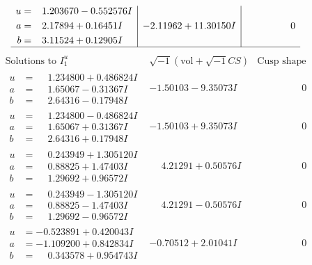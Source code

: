 \documentclass[1p]{elsarticle_modified}
\theoremstyle{definition}
\newcommand{\I}{\sqrt{-1}}
\begin{document}
$$\begin{array}{c|c|c}
\begin{aligned}
u &= \phantom{-}1.203670 - 0.552576 I \\
a &= \phantom{-}2.17894 + 0.16451 I \\
b &= \phantom{-}3.11524 + 0.12905 I\end{aligned}
 & -2.11962 + 11.30150 I & \phantom{-0.000000 } 0\\
 \hline 
 \end{array}$$\newpage$$\begin{array}{c|c|c}  
\text{Solutions to }I^u_{1}& \I (\text{vol} + \sqrt{-1}CS) & \text{Cusp shape}\\
 \hline 
\begin{aligned}
u &= \phantom{-}1.234800 + 0.486824 I \\
a &= \phantom{-}1.65067 - 0.31367 I \\
b &= \phantom{-}2.64316 - 0.17948 I\end{aligned}
 & -1.50103 - 9.35073 I & \phantom{-0.000000 } 0 \\ \hline\begin{aligned}
u &= \phantom{-}1.234800 - 0.486824 I \\
a &= \phantom{-}1.65067 + 0.31367 I \\
b &= \phantom{-}2.64316 + 0.17948 I\end{aligned}
 & -1.50103 + 9.35073 I & \phantom{-0.000000 } 0 \\ \hline\begin{aligned}
u &= \phantom{-}0.243949 + 1.305120 I \\
a &= \phantom{-}0.88825 + 1.47403 I \\
b &= \phantom{-}1.29692 + 0.96572 I\end{aligned}
 & \phantom{-}4.21291 + 0.50576 I & \phantom{-0.000000 } 0 \\ \hline\begin{aligned}
u &= \phantom{-}0.243949 - 1.305120 I \\
a &= \phantom{-}0.88825 - 1.47403 I \\
b &= \phantom{-}1.29692 - 0.96572 I\end{aligned}
 & \phantom{-}4.21291 - 0.50576 I & \phantom{-0.000000 } 0 \\ \hline\begin{aligned}
u &= -0.523891 + 0.420043 I \\
a &= -1.109200 + 0.842834 I \\
b &= \phantom{-}0.343578 + 0.954743 I\end{aligned}
 & -0.70512 + 2.01041 I & \phantom{-0.000000 } 0 \\ \hline\begin{aligned}

\end{aligned}
\end{array}$$
\end{document}
